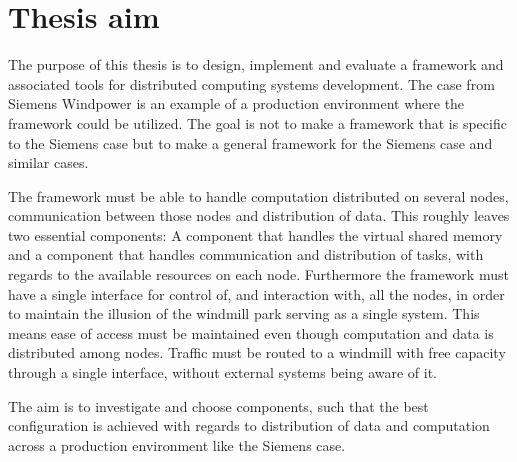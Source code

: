 
\section{Thesis aim}

The purpose of this thesis is to design, implement and evaluate a framework and associated tools for distributed computing systems development. The case from Siemens Windpower is an example of a production environment where the framework could be utilized. The goal is not to make a framework that is specific to the Siemens case but to make a general framework for the Siemens case and similar cases. 

The framework must be able to handle computation distributed on several nodes, communication between those nodes and distribution of data. This roughly leaves two essential components: A component that handles the virtual shared memory and a component that handles communication and distribution of tasks, with regards to the available resources on each node. Furthermore the framework must have a single interface for control of, and interaction with, all the nodes, in order to maintain the illusion of the windmill park serving as a single system. This means ease of access must be maintained even though computation and data is distributed among nodes. Traffic must be routed to a windmill with free capacity through a single interface, without external systems being aware of it.

The aim is to investigate and choose components, such that the best configuration is achieved with regards to distribution of data and computation across a production environment like the Siemens case. 


